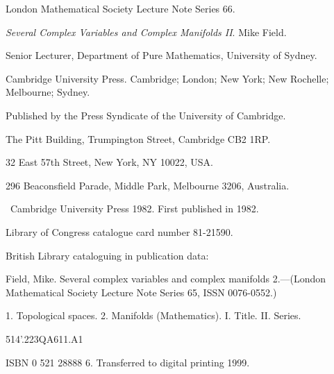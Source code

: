 \clearpage
\begingroup
    \thispagestyle{empty}
    \markboth{}{}
\noindent London Mathematical Society Lecture Note Series 66.\par
\emph{Several Complex Variables and Complex Manifolds II}. Mike Field.\par
Senior Lecturer, Department of Pure Mathematics, University of Sydney.\par
Cambridge University Press. Cambridge; London; New York; New Rochelle; Melbourne; Sydney.

\noindent Published by the Press Syndicate of the University of Cambridge.\par
The Pitt Building, Trumpington Street, Cambridge CB2 1RP.\par
32 East 57th Street, New York, NY 10022, USA.\par
296 Beaconsfield Parade, Middle Park, Melbourne 3206, Australia.

\noindent\textcopyright\ Cambridge University Press 1982. First published in 1982.\par
Library of Congress catalogue card number 81-21590.

\noindent British Library cataloguing in publication data:\par
Field, Mike. Several complex variables and complex manifolds 2.---(London Mathematical Society Lecture Note Series 65, ISSN 0076-0552.)\par
1. Topological spaces. 2. Manifolds (Mathematics). I. Title. II. Series.\par
514'.223\qquad QA611.A1\par
ISBN 0 521 28888 6. Transferred to digital printing 1999.

\medskip
{}
    \clearpage
\endgroup
